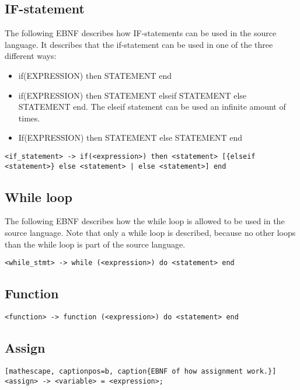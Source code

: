\subsection{IF-statement}
The following EBNF describes how IF-statements can be used in the source language. It describes that the if-statement can be used in one of the three different ways:
\begin{itemize}
	\item if(EXPRESSION) then STATEMENT end
	\item if(EXPRESSION) then STATEMENT elseif STATEMENT else STATEMENT end. The elseif statement can be used an infinite amount of times.
	\item If(EXPRESSION) then STATEMENT else STATEMENT end
\end{itemize}
\begin{lstlisting}[captionpos=b, caption={EBNF of the IF-statement in the source language}]
<if_statement> -> if(<expression>) then <statement> [{elseif <statement>} else <statement> | else <statement>] end
\end{lstlisting}


\subsection{While loop}
The following EBNF describes how the while loop is allowed to be used in the source language. Note that only a while loop is described, because no other loops than the while loop is part of the source language.
\begin{lstlisting}[mathescape, captionpos=b, caption={EBNF of a while loop.}]
<while_stmt> -> while (<expression>) do <statement> end
\end{lstlisting}

\subsection{Function}
\begin{lstlisting}[mathescape, captionpos=b, caption={EBNF of a function.}]
<function> -> function (<expression>) do <statement> end
\end{lstlisting}

\subsection{Assign}
\begin{lstlisting}[mathescape, captionpos=b, caption{EBNF of how assignment work.}]
<assign> -> <variable> = <expression>;
\end{lstlisting}

